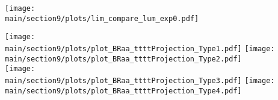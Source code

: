 \begin{figure*}[hbpt]
\centering
        \texttt{[image: \\main/section9/plots/lim\_compare\_lum\_exp0.pdf]}
    \caption{Projected expected limits on $(\sigma(h)/\sigma_{\textrm{SM}}) \mathcal{B}(h \to aa \to 4\tau)$, comparing different scenarios for systematic uncertainties for an integrated luminosity of 3000 fb$^{-1}$.}
    \label{fig:tttt_proj}
\end{figure*}

\begin{figure*}[hbpt]
\centering
        \texttt{[image: \\main/section9/plots/plot\_BRaa\_ttttProjection\_Type1.pdf]}
        \texttt{[image: \\main/section9/plots/plot\_BRaa\_ttttProjection\_Type2.pdf]} \\
        \texttt{[image: \\main/section9/plots/plot\_BRaa\_ttttProjection\_Type3.pdf]}
        \texttt{[image: \\main/section9/plots/plot\_BRaa\_ttttProjection\_Type4.pdf]}
    \caption{Expected upper limits on $(\sigma(h)/\sigma_{\textrm{SM}})\mathcal{B}( h \to aa)$ for 3000\fbinv of data with YR18 systematic uncertainties for the $4\tau$ final state in 2HDM+S type-1 (top left), type-2 (top right), type-3 (bottom left), and type-4 (bottom right).}
    \label{fig:summary_tttt}
\end{figure*}
